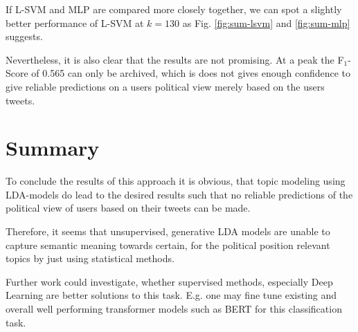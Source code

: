 \documentclass[sigconf, nonacm]{acmart}
\begin{document}
If L-SVM and MLP are compared more closely together, we can spot a slightly better performance of L-SVM at $k=130$ as Fig. \ref{fig:sum-lsvm} and \ref{fig:sum-mlp} suggests.

Nevertheless, it is also clear that the results are not promising. At a peak the F$_1$-Score of 0.565 can only be archived, which is does not gives enough confidence to give reliable predictions on a users political view merely based on the users tweets.

\section{Summary}
\label{sec:summ}
To conclude the results of this approach it is obvious, that topic modeling using LDA-models do lead to the desired results such that no reliable predictions of the political view of users based on their tweets can be made.

Therefore, it seems that unsupervised, generative LDA models are unable to capture semantic meaning towards certain, for the political position relevant topics by just using statistical methods.

Further work could investigate, whether supervised methods, especially Deep Learning are better solutions to this task. E.g. one may fine tune existing and overall well performing transformer models such as BERT for this classification task.




\end{document}
